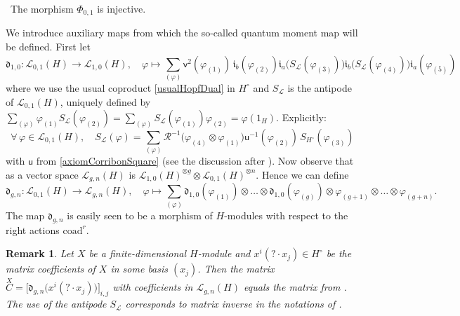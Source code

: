 \documentclass[11pt]{amsart}
\newtheorem{remark}[teo]{Remark}
\begin{document}
\smallskip

\indent \textbullet ~The morphism $\Phi_{0,1}$ is injective.

\smallskip

\noindent We introduce auxiliary maps from which the so-called quantum moment map will be defined. First let
\begin{equation}\label{frakD10}
\mathfrak{d}_{1,0} : \mathcal{L}_{0,1}(H) \to \mathcal{L}_{1,0}(H), \quad \varphi \mapsto \sum_{(\varphi)} \mathsf{v}^2(\varphi_{(1)})\, \mathfrak{i}_b(\varphi_{(2)}) \mathfrak{i}_a\bigl( S_{\mathcal{L}}(\varphi_{(3)})\bigr) \mathfrak{i}_b\bigl( S_{\mathcal{L}}(\varphi_{(4)}) \bigr)\mathfrak{i}_a(\varphi_{(5)})
\end{equation}
where we use the usual coproduct \eqref{usualHopfDual} in $H^\circ$ and $S_{\mathcal{L}}$ is the antipode of $\mathcal{L}_{0,1}(H)$, uniquely defined by $\textstyle \sum_{(\varphi)} \varphi_{(1)}S_{\mathcal{L}}(\varphi_{(2)}) = \sum_{(\varphi)} S_{\mathcal{L}}(\varphi_{(1)})\varphi_{(2)} = \varphi(1_H)$. Explicitly:
\begin{equation}\label{antipodeL01}
\forall \, \varphi \in \mathcal{L}_{0,1}(H), \quad S_{\mathcal{L}}(\varphi) = \textstyle \sum_{(\varphi)} \mathcal{R}^{-1}\bigl( \varphi_{(4)} \otimes \varphi_{(1)} \bigr) \mathsf{u}^{-1}(\varphi_{(2)}) \, S_{H^\circ}(\varphi_{(3)})
\end{equation}
with $\mathsf{u}$ from \eqref{axiomCorribonSquare} (see the discussion after \cite[eq. (3.24)]{BFR}). Now observe that as a vector space $\mathcal{L}_{g,n}(H)$ is $\mathcal{L}_{1,0}(H)^{\otimes g} \otimes \mathcal{L}_{0,1}(H)^{\otimes n}$. Hence we can define
\begin{equation}\label{pseudoQMMgnH}
\mathfrak{d}_{g,n} : \mathcal{L}_{0,1}(H) \to \mathcal{L}_{g,n}(H), \quad \varphi \mapsto \sum_{(\varphi)} \mathfrak{d}_{1,0}(\varphi_{(1)}) \otimes \ldots \otimes \mathfrak{d}_{1,0}(\varphi_{(g)}) \otimes \varphi_{(g+1)} \otimes \ldots \otimes \varphi_{(g+n)}.
\end{equation}
The map $\mathfrak{d}_{g,n}$ is easily seen to be a morphism of $H$-modules with respect to the right actions $\mathrm{coad}^r$.

\begin{remark}
{\rm Let $X$ be a finite-dimensional $H$-module and $x^i(?\cdot x_j) \in H^\circ$ be the matrix coefficients of $X$ in some basis $(x_j)$. Then the matrix $\overset{X}{C} = \bigl[ \mathfrak{d}_{g,n}\bigl( x^i(?\cdot x_j) \bigr) \bigr]_{i,j}$ with coefficients in $\mathcal{L}_{g,n}(H)$ equals the matrix from \cite[Def.\,7.11]{BFR}. The use of the antipode $S_{\mathcal{L}}$ corresponds to matrix inverse in the notations of \cite{BFR}.}
\end{remark}
\end{document}
